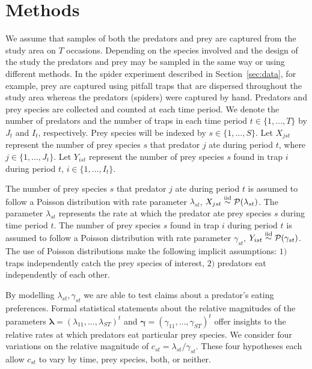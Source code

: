 \documentclass[smallextended]{svjour3}
\begin{document}
\section{Methods}
\label{sec:methods}

We assume that samples of both the predators and prey are captured from the study area on $T$ occasions.  Depending on the species involved and the design of the study the predators and prey may be sampled in the same way or using different methods.  In the spider experiment described in Section~\ref{sec:data}, for example, prey are captured using pitfall traps that are dispersed throughout the study area whereas the predators (spiders) were captured by hand.  Predators and prey species are collected and counted at each time period.  We denote the number of predators and the number of traps in each time period $t \in \{1, \ldots, T\}$ by $J_t$ and $I_t$, respectively.  Prey species will be indexed by $s \in \{1, \ldots, S \}$.  Let $X_{jst}$ represent the number of prey species $s$ that predator $j$ ate during period $t$, where $j \in \{1, \ldots, J_t\}$.  Let $Y_{ist}$ represent the number of prey species $s$ found in trap $i$ during period $t$, $i \in \{1, \ldots, I_t\}$.

The number of prey species $s$ that predator $j$ ate during period $t$ is assumed to follow a Poisson distribution with rate parameter $\lambda_{st}$, $X_{jst} \stackrel{\mathrm{iid}}{\sim} \mathcal{P}(\lambda_{st})$.  The parameter $\lambda_{st}$ represents the rate at which the predator ate prey species $s$ during time period $t$.  The number of prey species $s$ found in trap $i$ during period $t$ is assumed to follow a Poisson distribution with rate parameter $\gamma_{st}$, $Y_{ist} \stackrel{\mathrm{iid}}{\sim} \mathcal{P}(\gamma_{st})$.  The use of Poisson distributions make the following implicit assumptions: $1)$ traps independently catch the prey species of interest, $2)$ predators eat independently of each other.  

By modelling $\lambda_{st}, \gamma_{st}$ we are able to test claims about a predator's eating preferences.  Formal statistical statements about the relative magnitudes of the parameters $\boldsymbol{\lambda} = (\lambda_{11}, \ldots, \lambda_{ST})^t$ and $\boldsymbol{\gamma} = (\gamma_{11}, \ldots, \gamma_{ST})^t$ offer insights to the relative rates at which predators eat particular prey species.  We consider four variations on the relative magnitude of $c_{st} = \lambda_{st}/\gamma_{st}$.  These four hypotheses each allow $c_{st}$ to vary by time, prey species, both, or neither.
\end{document}
